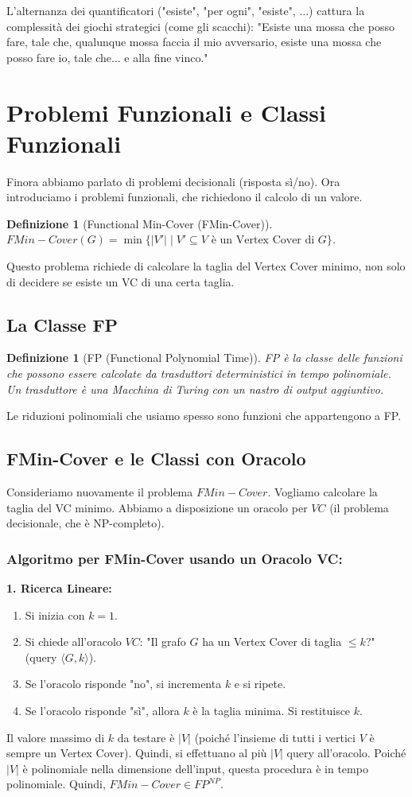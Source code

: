 \documentclass[a4paper, 11pt]{book} %
\newtheorem{definition}[theorem]{Definizione}
\theoremstyle{definition}
\begin{document}
L'alternanza dei quantificatori ("esiste", "per ogni", "esiste", ...) cattura la complessità dei giochi strategici (come gli scacchi): "Esiste una mossa che posso fare, tale che, qualunque mossa faccia il mio avversario, esiste una mossa che posso fare io, tale che... e alla fine vinco."

\section{Problemi Funzionali e Classi Funzionali}
Finora abbiamo parlato di problemi decisionali (risposta sì/no). Ora introduciamo i problemi funzionali, che richiedono il calcolo di un valore.

\begin{definition}[Functional Min-Cover (FMin-Cover)]
$FMin-Cover(G) = \min \{ |V'| \mid V' \subseteq V \text{ è un Vertex Cover di } G \}$.
\end{definition}
Questo problema richiede di calcolare la taglia del Vertex Cover minimo, non solo di decidere se esiste un VC di una certa taglia.

\subsection{La Classe FP}
\begin{definition}[FP (Functional Polynomial Time)]
FP è la classe delle funzioni che possono essere calcolate da trasduttori deterministici in tempo polinomiale. Un trasduttore è una Macchina di Turing con un nastro di output aggiuntivo.
\end{definition}
Le riduzioni polinomiali che usiamo spesso sono funzioni che appartengono a FP.

\subsection{FMin-Cover e le Classi con Oracolo}
Consideriamo nuovamente il problema $FMin-Cover$. Vogliamo calcolare la taglia del VC minimo. Abbiamo a disposizione un oracolo per $VC$ (il problema decisionale, che è NP-completo).

\subsubsection{Algoritmo per FMin-Cover usando un Oracolo VC:}
\textbf{1. Ricerca Lineare:}
\begin{enumerate}
    \item Si inizia con $k=1$.
    \item Si chiede all'oracolo $VC$: "Il grafo $G$ ha un Vertex Cover di taglia $\le k$?" (query $\langle G, k \rangle$).
    \item Se l'oracolo risponde "no", si incrementa $k$ e si ripete.
    \item Se l'oracolo risponde "sì", allora $k$ è la taglia minima. Si restituisce $k$.
\end{enumerate}
Il valore massimo di $k$ da testare è $|V|$ (poiché l'insieme di tutti i vertici $V$ è sempre un Vertex Cover). Quindi, si effettuano al più $|V|$ query all'oracolo. Poiché $|V|$ è polinomiale nella dimensione dell'input, questa procedura è in tempo polinomiale.
Quindi, $FMin-Cover \in FP^{NP}$.
\end{document}
